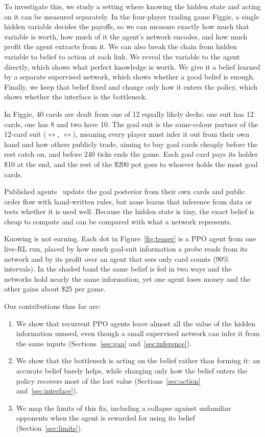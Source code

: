 \documentclass{article}
\newcommand{\Spade}{\ding{171}}
\newcommand{\Club}{\ding{168}}
\newcommand{\Heart}{\textcolor{red!75!black}{\ding{170}}}
\newcommand{\Diam}{\textcolor{red!75!black}{\ding{169}}}
\begin{document}
To investigate this, we study a setting where knowing the hidden state and acting on it can be measured separately. In the four-player trading game Figgie, a single hidden variable decides the payoffs, so we can measure exactly how much that variable is worth, how much of it the agent's network encodes, and how much profit the agent extracts from it. We can also break the chain from hidden variable to belief to action at each link. We reveal the variable to the agent directly, which shows what perfect knowledge is worth. We give it a belief learned by a separate supervised network, which shows whether a good belief is enough. Finally, we keep that belief fixed and change only how it enters the policy, which shows whether the interface is the bottleneck. %

In Figgie, 40 cards are dealt from one of 12 equally likely decks: one suit has 12 cards, one has 8 and two have 10.
The goal suit is the same-colour partner of the 12-card suit (\Spade$\leftrightarrow$\Club, \Heart$\leftrightarrow$\Diam), meaning every player must infer it out from their own hand and how others publicly trade, aiming to buy goal cards cheaply before the rest catch on, and before 240 ticks ends the game.
Each goal card pays its holder \$10 at the end, and the rest of the \$200 pot goes to whoever holds the most goal cards. %

Published agents~\cite{figment,figgiebot,cs224r2025figgie} update the goal posterior from their own cards and public order flow with hand-written rules, but none learns that inference from data or tests whether it is used well.
Because the hidden state is tiny, the exact belief is cheap to compute and can be compared with what a network represents.

Knowing is not earning. Each dot in Figure~\ref{fig:teaser} is a PPO agent from one live-RL run, placed by how much goal-suit information a probe reads from its network and by its profit over an agent that sees only card counts (90\% intervals). In the shaded band the same belief is fed in two ways and the networks hold nearly the same information, yet one agent loses money and the other gains about \$25 per game.

Our contributions thus far are:
\begin{enumerate}[leftmargin=1.4em,itemsep=1pt,topsep=2pt]
  \item We show that recurrent PPO agents leave almost all the value of the hidden information unused, even though a small supervised network can infer it from the same inputs (Sections~\ref{sec:gap} and~\ref{sec:inference}).
  \item We show that the bottleneck is acting on the belief rather than forming it: an accurate belief barely helps, while changing only how the belief enters the policy recovers most of the lost value (Sections~\ref{sec:action} and~\ref{sec:interface}).
  \item We map the limits of this fix, including a collapse against unfamiliar opponents when the agent is rewarded for using its belief (Section~\ref{sec:limits}).
\end{enumerate}
\end{document}
